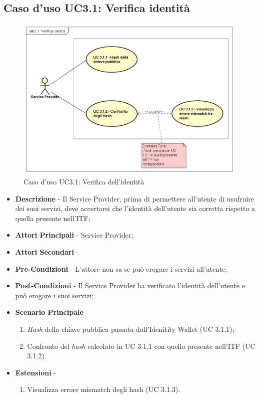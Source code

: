 \subsection{Caso d'uso UC3.1: Verifica identità}
\begin{figure}[h]
	\centering
	\includegraphics[scale=0.50]{immagini/usecase/UC31_VerificaIdentita}
	\caption{Caso d'uso UC3.1: Verifica dell'identità}
\end{figure}
\begin{itemize}
	\item \textbf{Descrizione} -  Il Service Provider, prima di permettere all'utente di usufruire dei suoi servizi, deve accertarsi che l'identità dell'utente sia corretta rispetto a quella presente nell'\gls{ITF};
	\item \textbf{Attori Principali} - Service Provider;
	\item \textbf{Attori Secondari} -
	\item \textbf{Pre-Condizioni} - L'attore non sa se può erogare i servizi all'utente;
	\item \textbf{Post-Condizioni} - Il Service Provider ha verificato l'identità dell'utente e può erogare i suoi servizi;
	\item \textbf{Scenario Principale} -
	\begin{enumerate}
		\item \textit{Hash} della chiave pubblica passata dall'Idenitity Wallet (UC 3.1.1);
		\item Confronto del \textit{hash} calcolato in UC 3.1.1 con quello presente nell'\gls{ITF} (UC 3.1.2).
	\end{enumerate}
	\item \textbf{Estensioni} -
	\begin{enumerate}
		\item Visualizza errore mismatch degli hash (UC 3.1.3).
	\end{enumerate}
\end{itemize}
